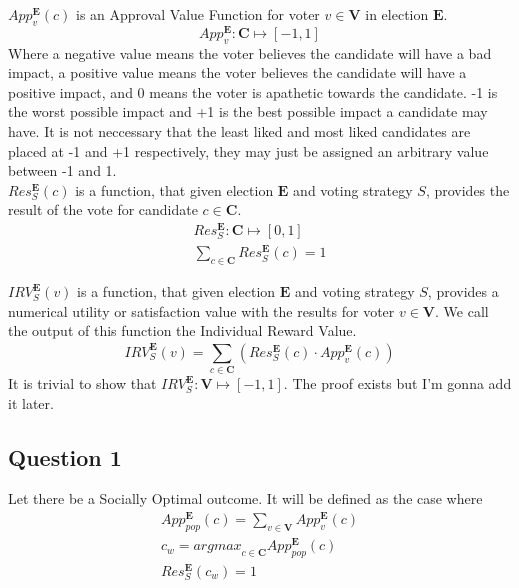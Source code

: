 \documentclass{article}
\begin{document}
$App^{\boldsymbol{E}}_{v}(c)$ is an Approval Value Function for voter $v \in \boldsymbol{V}$ in election $\boldsymbol{E}$.
\begin{equation}
App^{\boldsymbol{E}}_{v} : \boldsymbol{C} \mapsto [-1,1]
\end{equation}
Where a negative value means the voter believes the candidate will have a bad impact, a positive value means the voter believes the candidate will have a positive impact, and 0 means the voter is apathetic towards the candidate. -1 is the worst possible impact and +1 is the best possible impact a candidate may have. It is not neccessary that the least liked and most liked candidates are placed at -1 and +1 respectively, they may just be assigned an arbitrary value between -1 and 1.\\

$Res^{\boldsymbol{E}}_{S}(c)$ is a function, that given election $\boldsymbol{E}$ and voting strategy $S$, provides the result of the vote for candidate $c \in \boldsymbol{C}$.
\begin{gather}
Res^{\boldsymbol{E}}_{S} : \boldsymbol{C} \mapsto [0,1]\\
\sum^{}_{c \in \boldsymbol{C}}{Res^{\boldsymbol{E}}_{S}(c)} = 1
\end{gather}

${IRV}^{\boldsymbol{E}}_{S}(v)$ is a function, that given election $\boldsymbol{E}$ and voting strategy $S$, provides a numerical utility or satisfaction value with the results for voter $v \in \boldsymbol{V}$. We call the output of this function the Individual Reward Value.
\begin{equation}
{IRV}^{\boldsymbol{E}}_{S}(v) = \sum^{}_{c \in \boldsymbol{C}}{(Res^{\boldsymbol{E}}_{S}(c) \cdot App^{\boldsymbol{E}}_{v}(c))}
\end{equation}
It is trivial to show that ${IRV}^{\boldsymbol{E}}_{S} : \boldsymbol{V} \mapsto [-1,1]$. The proof exists but I'm gonna add it later.


\subsection{Question 1}

Let there be a Socially Optimal outcome. It will be defined as the case where
\begin{gather}
App^{\boldsymbol{E}}_{pop}(c) = \sum^{}_{v \in \boldsymbol{V}}{App^{\boldsymbol{E}}_{v}(c)}\\
c_{w} = {argmax}_{c \in \boldsymbol{C}} App^{\boldsymbol{E}}_{pop}(c)\\
Res^{\boldsymbol{E}}_{S}(c_{w}) = 1
\end{gather}\\
\end{document}
